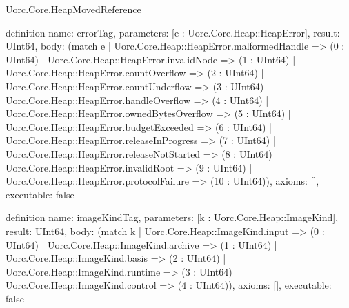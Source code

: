 \begin{lexlean}{Uorc.Core.HeapMovedReference}
\begin{semanticmodule}
definition{
  name: errorTag,
  parameters: [e : Uorc.Core.Heap::HeapError],
  result: UInt64,
  body: (match e
    | Uorc.Core.Heap::HeapError.malformedHandle => (0 : UInt64)
    | Uorc.Core.Heap::HeapError.invalidNode => (1 : UInt64)
    | Uorc.Core.Heap::HeapError.countOverflow => (2 : UInt64)
    | Uorc.Core.Heap::HeapError.countUnderflow => (3 : UInt64)
    | Uorc.Core.Heap::HeapError.handleOverflow => (4 : UInt64)
    | Uorc.Core.Heap::HeapError.ownedBytesOverflow => (5 : UInt64)
    | Uorc.Core.Heap::HeapError.budgetExceeded => (6 : UInt64)
    | Uorc.Core.Heap::HeapError.releaseInProgress => (7 : UInt64)
    | Uorc.Core.Heap::HeapError.releaseNotStarted => (8 : UInt64)
    | Uorc.Core.Heap::HeapError.invalidRoot => (9 : UInt64)
    | Uorc.Core.Heap::HeapError.protocolFailure => (10 : UInt64)),
  axioms: [],
  executable: false
}

definition{
  name: imageKindTag,
  parameters: [k : Uorc.Core.Heap::ImageKind],
  result: UInt64,
  body: (match k
    | Uorc.Core.Heap::ImageKind.input => (0 : UInt64)
    | Uorc.Core.Heap::ImageKind.archive => (1 : UInt64)
    | Uorc.Core.Heap::ImageKind.basis => (2 : UInt64)
    | Uorc.Core.Heap::ImageKind.runtime => (3 : UInt64)
    | Uorc.Core.Heap::ImageKind.control => (4 : UInt64)),
  axioms: [],
  executable: false
}


\end{semanticmodule}
\end{lexlean}
